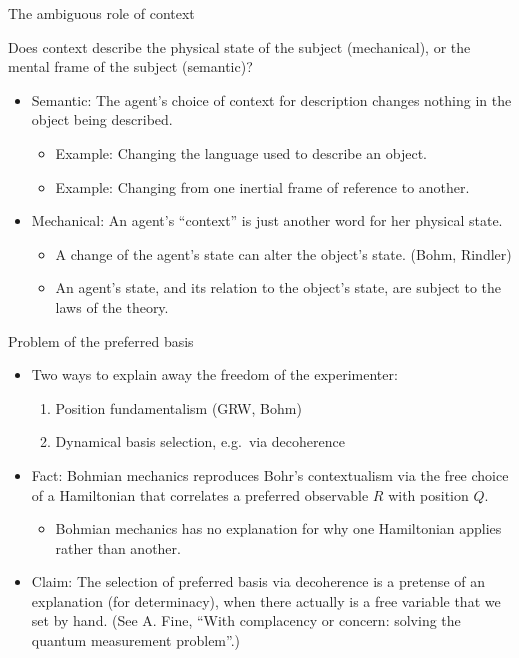 \documentclass[fleqn]{beamer}
\begin{document}
\begin{frame}{The ambiguous role of context}

  Does context describe the physical state of the subject
  (mechanical), or the mental frame of the subject (semantic)?

  \begin{itemize}
  \item Semantic: The agent's choice of context for description
    changes nothing in the object being described.
    \begin{itemize}
    \item Example: Changing the language used to describe an object.
    \item Example: Changing from one inertial frame of reference to
      another.
    \end{itemize}
  \item Mechanical: An agent's ``context'' is just another word for
    her physical state.
    \begin{itemize}
    \item A change of the agent's state can alter the object's
      state. (Bohm, Rindler)
    \item An agent's state, and its relation to the object's state,
      are subject to the laws of the theory.
   \end{itemize}
  \end{itemize}

\end{frame}


\begin{frame}{Problem of the preferred basis}

  \begin{itemize}
  \item Two ways to explain away the freedom of the experimenter:

    \begin{enumerate}
    \item Position fundamentalism (GRW, Bohm)
    \item Dynamical basis selection, e.g.\ via decoherence
    \end{enumerate}
     
  \item Fact: Bohmian mechanics reproduces Bohr's contextualism via
    the free choice of a Hamiltonian that correlates a preferred
    observable $R$ with position $Q$.
    \begin{itemize}
    \item Bohmian mechanics has no explanation for why one Hamiltonian
      applies rather than another.
    \end{itemize}

  \item Claim: The selection of preferred basis via decoherence is a
    pretense of an explanation (for determinacy), when there actually
    is a free variable that we set by hand. (See A. Fine, ``With
    complacency or concern: solving the quantum measurement
    problem''.)
  \end{itemize}

\end{frame}
\end{document}
